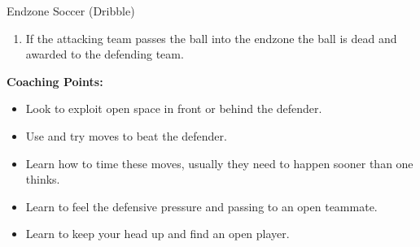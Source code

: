 \begin{evenBlock}{Endzone Soccer (Dribble)}
\begin{minipage}[t]{\linewidth}
\begin{minipage}{.6\linewidth}
\begin{enumerate}
            \item If the attacking team passes the ball into the endzone the ball is dead and awarded to the defending team.
        \end{enumerate}
    \end{minipage}
\end{minipage}
\raggedright
    \textbf{Coaching Points:}
    \begin{itemize}
        \setlength{\itemsep}{0pt}
        \setlength{\parskip}{0pt}
        \setlength{\parsep}{0pt}
        \item Look to exploit open space in front or behind the defender.
        \item Use and try moves to beat the defender.
        \item Learn how to time these moves, usually they need to happen sooner than one thinks.
        \item Learn to feel the defensive pressure and passing to an open teammate.
        \item Learn to keep your head up and find an open player.

    \end{itemize}

\end{evenBlock}